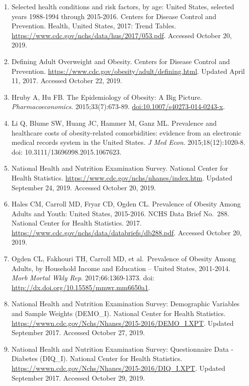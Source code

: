 \documentclass[]{article}
\begin{document}
\begin{enumerate}
\def\labelenumi{\arabic{enumi}.}
\item
  Selected health conditions and risk factors, by age: United States,
  selected years 1988-1994 through 2015-2016. Centers for Disease
  Control and Prevention. Health, United States, 2017: Trend Tables.
  \url{https://www.cdc.gov/nchs/data/hus/2017/053.pdf}. Accessed October
  20, 2019.
\item
  Defining Adult Overweight and Obesity. Centers for Disease Control and
  Prevention. \url{https://www.cdc.gov/obesity/adult/defining.html}.
  Updated April 11, 2017. Accessed October 22, 2019.
\item
  Hruby A, Hu FB. The Epidemiology of Obesity: A Big Picture.
  \emph{Pharmacoeconomics}. 2015;33(7):673-89.
  \url{doi:10.1007/s40273-014-0243-x}.
\item
  Li Q, Blume SW, Huang JC, Hammer M, Ganz ML. Prevalence and healthcare
  costs of obesity-related comorbidities: evidence from an electronic
  medical records system in the United States. \emph{J Med Econ}.
  2015;18(12):1020-8. doi: 10.3111/13696998.2015.1067623.
\item
  National Health and Nutrition Examination Survey. National Center for
  Health Statistics. \url{https://www.cdc.gov/nchs/nhanes/index.htm}.
  Updated September 24, 2019. Accessed October 20, 2019.
\item
  Hales CM, Carroll MD, Fryar CD, Ogden CL. Prevalence of Obesity Among
  Adults and Youth: United States, 2015-2016. NCHS Data Brief No.~288.
  National Center for Health Statistics. 2017.
  \url{https://www.cdc.gov/nchs/data/databriefs/db288.pdf}. Accessed
  October 20, 2019.
\item
  Ogden CL, Fakhouri TH, Carroll MD, et al.~Prevalence of Obesity Among
  Adults, by Household Income and Education -- United States, 2011-2014.
  \emph{Morb Mortal Wkly Rep}. 2017;66:1369-1373. doi:
  \url{http://dx.doi.org/10.15585/mmwr.mm6650a1}.
\item
  National Health and Nutrition Examination Survey: Demographic
  Variables and Sample Weights (DEMO\_I). National Center for Health
  Statistics.
  \url{https://wwwn.cdc.gov/Nchs/Nhanes/2015-2016/DEMO_I.XPT}. Updated
  September 2017. Accessed October 27, 2019.
\item
  National Health and Nutrition Examination Survey: Questionnaire Data -
  Diabetes (DIQ\_I). National Center for Health Statistics.
  \url{https://wwwn.cdc.gov/Nchs/Nhanes/2015-2016/DIQ_I.XPT}. Updated
  September 2017. Accessed October 29, 2019.

\end{enumerate}
\end{document}
